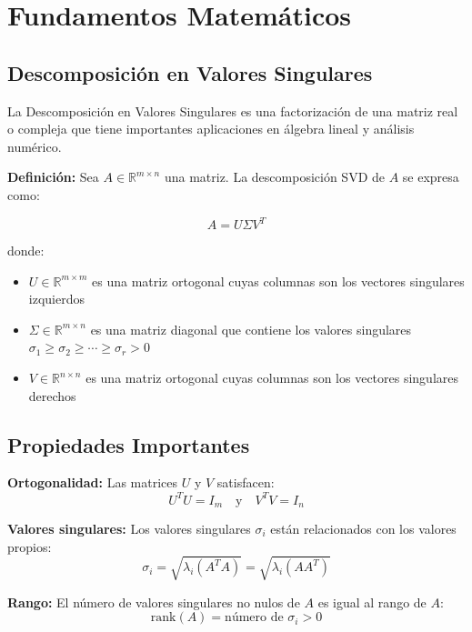 \documentclass[12pt,a4paper]{article}
\begin{document}
	\section{Fundamentos Matemáticos}
	
	\subsection{Descomposición en Valores Singulares}
	
	La Descomposición en Valores Singulares es una factorización de una matriz real o compleja que tiene importantes aplicaciones en álgebra lineal y análisis numérico.
	
	\textbf{Definición:} Sea $A \in \mathbb{R}^{m \times n}$ una matriz. La descomposición SVD de $A$ se expresa como:
	
	\begin{equation}
		A = U \Sigma V^T
	\end{equation}
	
	donde:
	\begin{itemize}
		\item $U \in \mathbb{R}^{m \times m}$ es una matriz ortogonal cuyas columnas son los vectores singulares izquierdos
		\item $\Sigma \in \mathbb{R}^{m \times n}$ es una matriz diagonal que contiene los valores singulares $\sigma_1 \geq \sigma_2 \geq \cdots \geq \sigma_r > 0$
		\item $V \in \mathbb{R}^{n \times n}$ es una matriz ortogonal cuyas columnas son los vectores singulares derechos
	\end{itemize}
	
	\subsection{Propiedades Importantes}
	
	\textbf{Ortogonalidad:} Las matrices $U$ y $V$ satisfacen:
	\begin{equation}
		U^T U = I_m \quad \text{y} \quad V^T V = I_n
	\end{equation}
	
	\textbf{Valores singulares:} Los valores singulares $\sigma_i$ están relacionados con los valores propios:
	\begin{equation}
		\sigma_i = \sqrt{\lambda_i(A^T A)} = \sqrt{\lambda_i(A A^T)}
	\end{equation}
	
	\textbf{Rango:} El número de valores singulares no nulos de $A$ es igual al rango de $A$:
	\begin{equation}
		\text{rank}(A) = \text{número de } \sigma_i > 0
	\end{equation}
	
\end{document}
